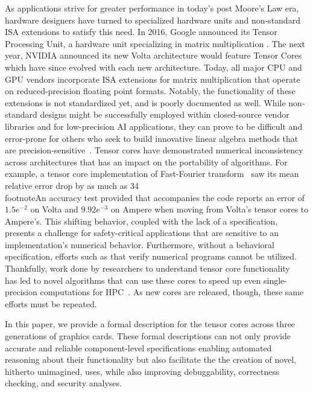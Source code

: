 As applications strive for greater performance in today's post Moore's Law era, hardware designers have turned to specialized hardware units and non-standard ISA extensions to satisfy this need. In 2016, Google announced its Tensor Processing Unit, a hardware unit specializing in matrix multiplication \cite{google-tpu}. The next year, NVIDIA announced its new Volta architecture would feature Tensor Cores \cite{volta-whitepaper} which have since evolved with each new architecture.
Today, all major CPU and GPU vendors incorporate ISA extensions for matrix multiplication that operate on reduced-precision floating point formats.
Notably, the functionality of these extensions is not standardized yet, and is poorly documented as well.
While non-standard designs might be successfully employed within closed-source vendor libraries and for low-precision AI applications, they can prove to be difficult and error-prone for others who seek to build innovative linear algebra methods that are precision-sensitive~\cite{haidar2020mixed}.
Tensor cores have demonstrated numerical inconsistency across architectures that has an impact on the portability of algorithms. For example, a tensor core implementation of Fast-Fourier transform~\cite{tcfft2024} saw its mean relative error drop by as much as 34\\footnote{An accuracy test provided that accompanies the code reports an error of $1.5e^{-2}$ on Volta and $9.92e^{-3}$ on Ampere} when moving from Volta's tensor cores to Ampere's. This shifting behavior, coupled with the lack of a specification, presents a challenge for safety-critical applications that are sensitive to an implementation's numerical behavior. Furthermore, without a behavioral specification, efforts such as \citet{Goodloe_Muñoz_Kirchner_Correnson_2013} that verify numerical programs cannot be utilized.
Thankfully, work done by researchers to understand tensor core functionality~\cite{fasi2021numerical,Hickmann2019ExperimentalAO,xinyili24} has led to novel algorithms that can use these cores to speed up even single-precision computations for HPC~\cite{markidis,ootomo2022recovering}. As new cores are released, though, these same efforts must be repeated.

In this paper, we provide a formal description for the tensor cores across three generations of graphics cards. These formal descriptions can not only provide accurate and reliable component-level specifications enabling automated reasoning about their functionality but also facilitate the the creation of novel, hitherto unimagined, uses, while also improving debuggability, correctness checking, and security analyses.

